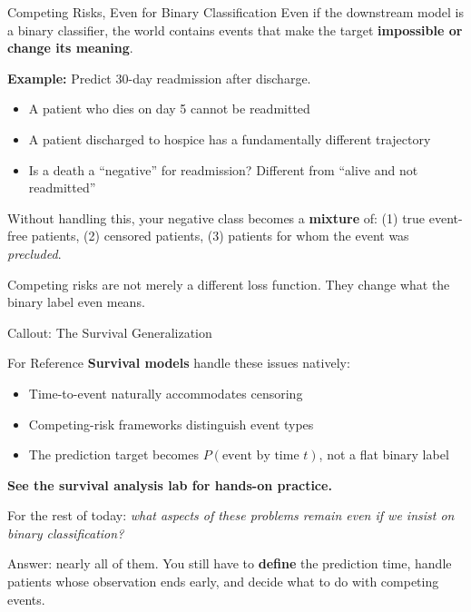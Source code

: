 \documentclass[aspectratio=169,10pt]{beamer}
\begin{document}
\begin{frame}{Competing Risks, Even for Binary Classification}
Even if the downstream model is a binary classifier, the world contains events that make the target \textbf{impossible or change its meaning}.
\vspace{0.3em}

\textbf{Example:} Predict 30-day readmission after discharge.
\begin{itemize}[<+->]
    \item A patient who dies on day 5 cannot be readmitted
    \item A patient discharged to hospice has a fundamentally different trajectory
    \item Is a death a ``negative'' for readmission? Different from ``alive and not readmitted''
\end{itemize}
\vspace{0.2em}
Without handling this, your negative class becomes a \textbf{mixture} of: (1) true event-free patients, (2) censored patients, (3) patients for whom the event was \emph{precluded}.
\vspace{0.2em}

\alert{Competing risks are not merely a different loss function. They change what the binary label even means.}
\end{frame}

\begin{frame}{Callout: The Survival Generalization}
\begin{block}{For Reference}
\textbf{Survival models} handle these issues natively:
\begin{itemize}
    \item Time-to-event naturally accommodates censoring
    \item Competing-risk frameworks distinguish event types
    \item The prediction target becomes $P(\text{event by time } t)$, not a flat binary label
\end{itemize}
\textbf{See the survival analysis lab for hands-on practice.}
\end{block}
\vspace{0.3em}
For the rest of today: \emph{what aspects of these problems remain even if we insist on binary classification?}

\pause
Answer: nearly all of them. You still have to \textbf{define} the prediction time, handle patients whose observation ends early, and decide what to do with competing events.
\end{frame}
\end{document}
